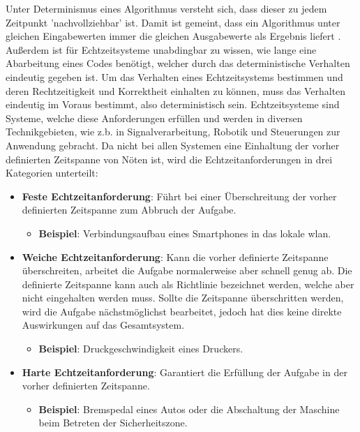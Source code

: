 \documentclass[../EDF Master Thesis.tex]{subfiles}
\begin{document}
Unter Determinismus eines Algorithmus versteht sich, dass dieser zu jedem Zeitpunkt 'nachvollziehbar' ist.
Damit ist gemeint, dass ein Algorithmus unter gleichen Eingabewerten immer die gleichen Ausgabewerte als Ergebnis liefert \autocite{determinismus}.
Außerdem ist für Echtzeitsysteme unabdingbar zu wissen, wie lange eine Abarbeitung eines Codes benötigt, welcher durch das deterministische Verhalten eindeutig gegeben ist. 
Um das Verhalten eines Echtzeitsystems bestimmen und deren Rechtzeitigkeit und Korrektheit einhalten zu können, muss das Verhalten eindeutig im Voraus bestimmt, also deterministisch sein.
    Echtzeitsysteme sind Systeme, welche diese Anforderungen erfüllen und werden in diversen Technikgebieten, wie z.b. in Signalverarbeitung, Robotik und Steuerungen zur Anwendung gebracht.
    Da nicht bei allen Systemen eine Einhaltung der vorher definierten Zeitspanne von Nöten ist, wird die Echtzeitanforderungen in drei Kategorien unterteilt:
    \begin{itemize}
        \item \textbf{Feste Echtzeitanforderung}: Führt bei einer Überschreitung der vorher definierten Zeitspanne zum Abbruch der Aufgabe.
            \begin{itemize}
                \item \textbf{Beispiel}: Verbindungsaufbau eines Smartphones in das lokale \ac{wlan}.
            \end{itemize}
        \item \textbf{Weiche Echtzeitanforderung}: Kann die vorher definierte Zeitspanne überschreiten, arbeitet die Aufgabe normalerweise aber schnell genug ab.
            Die definierte Zeitspanne kann auch als Richtlinie bezeichnet werden, welche aber nicht eingehalten werden muss. 
            Sollte die Zeitspanne überschritten werden, wird die Aufgabe nächstmöglichst bearbeitet, jedoch hat dies keine direkte Auswirkungen auf das Gesamtsystem.
            \begin{itemize}
                \item \textbf{Beispiel}: Druckgeschwindigkeit eines Druckers.
            \end{itemize}
        \item \textbf{Harte Echtzeitanforderung}: Garantiert die Erfüllung der Aufgabe in der vorher definierten Zeitspanne.
        \begin{itemize}
            \item \textbf{Beispiel}: Bremspedal eines Autos oder die Abschaltung der Maschine beim Betreten der Sicherheitszone.
        \end{itemize}
    \end{itemize}
\end{document}
